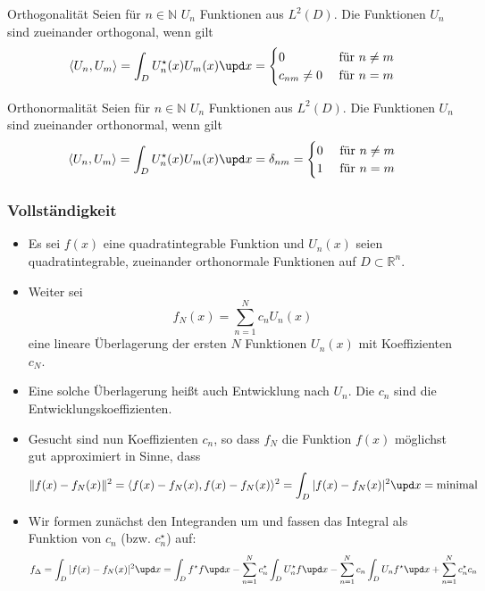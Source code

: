     \begin{frame}
    \begin{block}{Orthogonalität}
      Seien für $n \in \mathbb{N}$ $U_n$ Funktionen aus $L^2(D)$. Die Funktionen $U_n$ sind zueinander \alert{orthogonal}, wenn gilt
      $$
      \langle U_n, U_m\rangle = \int_D U_n^\star (x) U_m(x) \upd x =
      \begin{cases}
        0  & \text{ für } n\ne m \\
        c_{nm}\neq 0 & \text{ für } n = m
        \end{cases}
        $$
    \end{block}\pause
    \begin{block}{Orthonormalität}
      Seien für $n \in \mathbb{N}$ $U_n$ Funktionen aus $L^2(D)$. Die Funktionen $U_n$ sind zueinander \alert{orthonormal}, wenn gilt
      $$
      \langle U_n, U_m\rangle = \int_D U_n^\star (x) U_m(x) \upd x = \delta_{nm} =
      \begin{cases}
        0  & \text{ für } n\ne m \\
        1 & \text{ für } n = m
        \end{cases}
        $$
    \end{block}\pause

    
  \end{frame}
  \begin{frame}
    \frametitle{Vollständigkeit}
    \begin{itemize}[<+->]
    \item Es sei $f(x)$ eine quadratintegrable Funktion und $U_n(x)$ seien quadratintegrable, zueinander orthonormale Funktionen auf $D \subset \mathbb{R}^n$.
    \item Weiter sei
      $$
      f_N(x) = \sum_{n=1}^N c_n U_n(x) 
      $$
      eine \alert{lineare Überlagerung} der ersten $N$ Funktionen $U_n(x)$ mit Koeffizienten $c_N$.
    \item Eine solche Überlagerung heißt auch \alert{Entwicklung nach $U_n$}. Die $c_n$ sind die \alert{Entwicklungskoeffizienten}.
    \item Gesucht sind nun Koeffizienten $c_n$, so dass $f_N$ die Funktion $f(x)$ \alert{möglichst gut approximiert} in Sinne, dass
      $$
      \| f(x) - f_N(x)\|^2 = \langle f(x) - f_N(x), f(x) - f_N(x) \rangle^2 = \int_D |f(x) - f_N(x)|^2 \upd x = \text{minimal}
      $$
    \item Wir formen zunächst den Integranden um und fassen das Integral als Funktion von $c_n$ (bzw. $c_n^\star$) auf: 
      $$
      f_\Delta =\int_D |f(x) - f_N(x)|^2 \upd x = \int_D f^\star f \upd x -\sum_{n=1}^N c_n^\star \int_D U_n^\star f \upd x -\sum_{n=1}^N c_n \int_D U_n f^\star \upd x + \sum_{n=1}^N c_n^\star c_n
      $$
      \end{itemize}
    \end{frame}

